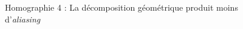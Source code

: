 \begin{figure}
\caption{Homographie 4 : La décomposition géométrique produit moins d'\emph{aliasing}}
\label{Homo4}
\end{figure}

